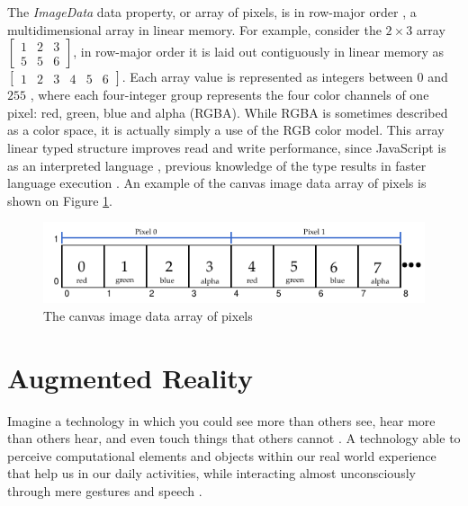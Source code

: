 The \textit{ImageData} data property, or array of pixels, is in row-major order \cite{Canvas2013} \cite{MDN2013}, a multidimensional array in linear memory. For example, consider the $2\times3$ array $\begin{bmatrix}
1 & 2 & 3\\
5 & 5 & 6
\end{bmatrix}$, in row-major order it is laid out contiguously in linear memory as $\begin{bmatrix}
1 & 2 & 3 & 4 & 5 & 6
\end{bmatrix}$. Each array value is represented as integers between $0$ and $255$ \cite{Canvas2013} \cite{MDN2013}, where each four-integer group represents the four color channels of one pixel: red, green, blue and alpha (RGBA). While RGBA \cite{Gonzalez2007} is sometimes described as a color space, it is actually simply a use of the RGB \cite{Gonzalez2007} color model. This array linear typed structure improves read and write performance, since JavaScript is as an interpreted language \cite{International2009} \cite{MDN2013}, previous knowledge of the type results in faster language execution \cite{TypedArray2013} \cite{MDN2013}. An example of the canvas \cite{Canvas2013} image data array of pixels is shown on Figure \ref{figure:imagedata_array}.

\begin{figure}[!htb]
  \centering
  \includegraphics[width=\linewidth]{chapters/basic_concepts/imagedata_array.pdf}
  \caption{The canvas image data array of pixels}
  \label{figure:imagedata_array}
\end{figure}



\section{Augmented Reality} %
\label{sec:basic_concepts:augmented_reality}

Imagine a technology in which you could see more than others see, hear more than others hear, and even touch things that others cannot \cite{Krevelen2010}. A technology able to perceive computational elements and objects within our real world experience that help us in our daily activities, while interacting almost unconsciously through mere gestures and speech \cite{Krevelen2010,Teichrieb2007}.

